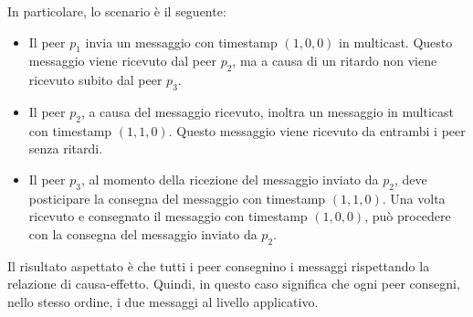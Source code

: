 \documentclass[acmtog]{acmart}
\begin{document}
In particolare, lo scenario è il seguente:
\begin{itemize}
\item Il peer $p_1$ invia un messaggio con timestamp $(1, 0, 0)$ in multicast. Questo messaggio viene ricevuto dal peer $p_2$, ma a causa di un ritardo non viene ricevuto subito dal peer $p_3$.
\item Il peer $p_2$, a causa del messaggio ricevuto, inoltra un messaggio in multicast con timestamp $(1, 1, 0)$. Questo messaggio viene ricevuto da entrambi i peer senza ritardi. 
\item Il peer $p_3$, al momento della ricezione del messaggio inviato da $p_2$, deve posticipare la consegna del messaggio con timestamp $(1, 1, 0)$. Una volta ricevuto e consegnato il messaggio con timestamp $(1, 0, 0)$, può procedere con la consegna del messaggio inviato da $p_2$.
\end{itemize}

Il risultato aspettato è che tutti i peer consegnino i messaggi rispettando la relazione di causa-effetto. Quindi, in questo caso significa che ogni peer consegni, nello stesso ordine, i due messaggi al livello applicativo.
\end{document}
